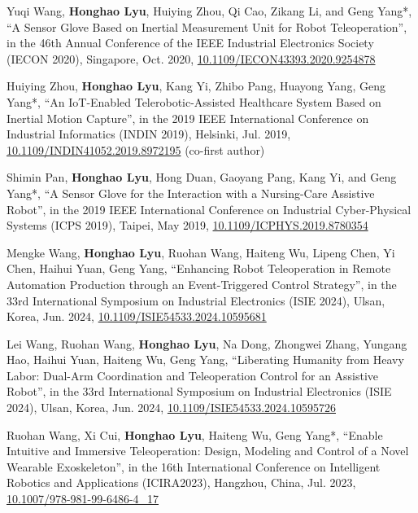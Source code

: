 \begin{enumerate}[align=left, widest={[\textbf{S.1}]}, itemindent=0em, label={\textbf{[\arabic*]}]
    \item[\textbf{[C.10]}] Yuqi Wang, \textbf{Honghao Lyu}, Huiying Zhou, Qi Cao, Zikang Li, and Geng Yang*, ``A Sensor Glove Based on Inertial Measurement Unit for Robot Teleoperation'', in the 46th Annual Conference of the IEEE Industrial Electronics Society (IECON 2020), Singapore, Oct. 2020, \href{https://doi.org/10.1109/IECON43393.2020.9254878}{10.1109/IECON43393.2020.9254878}
    \item[\textbf{[C.9]}] Huiying Zhou\dag, \textbf{Honghao Lyu\dag}, Kang Yi, Zhibo Pang, Huayong Yang, Geng Yang*, ``An IoT-Enabled Telerobotic-Assisted Healthcare System Based on Inertial Motion Capture'', in the 2019 IEEE International Conference on Industrial Informatics (INDIN 2019), Helsinki, Jul. 2019, \href{https://doi.org/10.1109/INDIN41052.2019.8972195}{10.1109/INDIN41052.2019.8972195} (co-first author)
    \item[\textbf{[C.8]}] Shimin Pan, \textbf{Honghao Lyu}, Hong Duan, Gaoyang Pang, Kang Yi, and Geng Yang*, ``A Sensor Glove for the Interaction with a Nursing-Care Assistive Robot'', in the 2019 IEEE International Conference on Industrial Cyber-Physical Systems (ICPS 2019), Taipei, May 2019, \href{https://doi.org/10.1109/ICPHYS.2019.8780354}{10.1109/ICPHYS.2019.8780354}
    \item[\textbf{[C.7]}] Mengke Wang, \textbf{Honghao Lyu}, Ruohan Wang, Haiteng Wu, Lipeng Chen, Yi Chen, Haihui Yuan, Geng Yang, ``Enhancing Robot Teleoperation in Remote Automation Production through an Event-Triggered Control Strategy'', in the 33rd International Symposium on Industrial Electronics (ISIE 2024), Ulsan, Korea, Jun. 2024, \href{https://doi.org/10.1109/ISIE54533.2024.10595681}{10.1109/ISIE54533.2024.10595681}
    \item[\textbf{[C.6]}] Lei Wang, Ruohan Wang, \textbf{Honghao Lyu}, Na Dong, Zhongwei Zhang, Yungang Hao, Haihui Yuan, Haiteng Wu, Geng Yang, ``Liberating Humanity from Heavy Labor: Dual-Arm Coordination and Teleoperation Control for an Assistive Robot'', in the 33rd International Symposium on Industrial Electronics (ISIE 2024), Ulsan, Korea, Jun. 2024, \href{https://doi.org/10.1109/ISIE54533.2024.10595726}{10.1109/ISIE54533.2024.10595726}
    \item[\textbf{[C.5]}] Ruohan Wang, Xi Cui, \textbf{Honghao Lyu}, Haiteng Wu, Geng Yang*, ``Enable Intuitive and Immersive Teleoperation: Design, Modeling and Control of a Novel Wearable Exoskeleton'', in the 16th International Conference on Intelligent Robotics and Applications (ICIRA2023), Hangzhou, China, Jul. 2023, \href{https://doi.org/10.1007/978-981-99-6486-4_17}{10.1007/978-981-99-6486-4\_17}

\end{enumerate}
